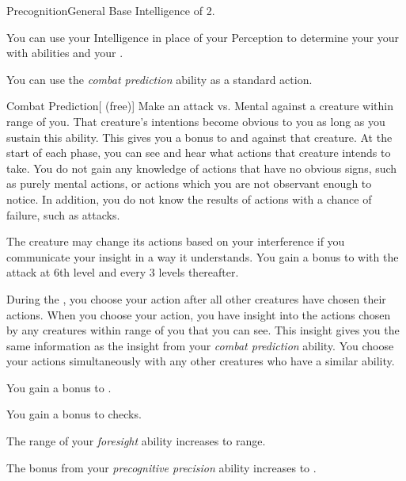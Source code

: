     \begin{feat}{Precognition}{General}
        \featpre Base Intelligence of 2.

         You can use your Intelligence in place of your Perception to determine your your  with  abilities and your .

         You can use the \textit{combat prediction} ability as a standard action.
        \begin{freeability}{Combat Prediction}[ (free)]
            Make an attack vs. Mental against a creature within \rngmed range of you.
            \hit That creature's intentions become obvious to you as long as you sustain this ability.
            This gives you a  bonus to  and  against that creature.
            At the start of each phase, you can see and hear what actions that creature intends to take.
            You do not gain any knowledge of actions that have no obvious signs, such as purely mental actions, or actions which you are not observant enough to notice.
            In addition, you do not know the results of actions with a chance of failure, such as attacks.

            The creature may change its actions based on your interference if you communicate your insight in a way it understands.
            \rankline
            You gain a  bonus to  with the attack at 6th level and every 3 levels thereafter.
        \end{freeability}

         During the , you choose your action after all other creatures have chosen their actions.
        When you choose your action, you have insight into the actions chosen by any creatures within \rngshort range of you that you can see.
        This insight gives you the same information as the insight from your \textit{combat prediction} ability.
        You choose your actions simultaneously with any other creatures who have a similar ability.

         You gain a  bonus to .

         You gain a  bonus to  checks.

         The range of your \textit{foresight} ability increases to \rnglong range.

         The bonus from your \textit{precognitive precision} ability increases to .
    \end{feat}

